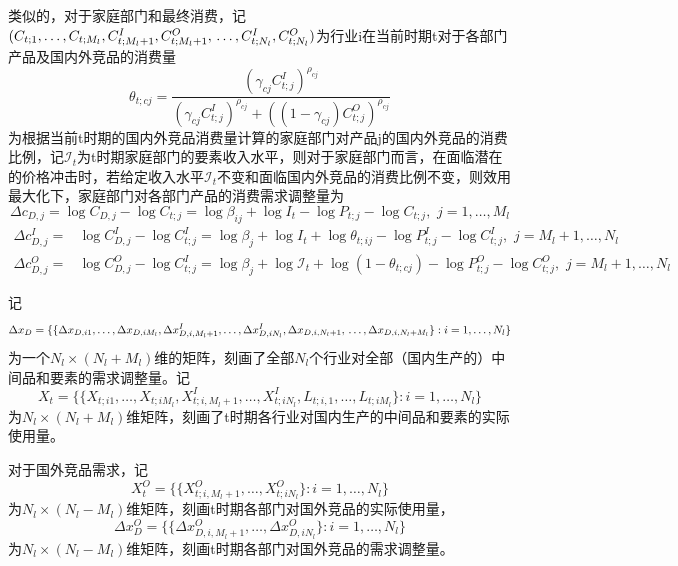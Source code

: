 \documentclass{article}
\begin{document}
类似的，对于家庭部门和最终消费，记
$(C_{t;1},\dots,C_{t;M_l},C_{t;M_l+1}^I,C_{t;M_l+1}^O,\\\dots,C_{t;N_l}^I,C_{t;N_l}^O)$为行业i在当前时期t对于各部门产品及国内外竞品的消费量
\begin{equation}
\theta_{t;cj}=\frac{\left(\gamma_{cj}C_{t;j}^I\right)^{\rho_{cj}}}{\left(\gamma_{cj}C_{t;j}^I\right)^{\rho_{cj}}+\left((1-\gamma_{cj})C_{t;j}^O\right)^{\rho_{cj}}}
\end{equation} 为根据当前t时期的国内外竞品消费量计算的家庭部门对产品j的国内外竞品的消费比例，记$\mathcal{I}_{t}$为t时期家庭部门的要素收入水平，则对于家庭部门而言，在面临潜在的价格冲击时，若给定收入水平$\mathcal{I}_t$不变和面临国内外竞品的消费比例不变，则效用最大化下，家庭部门对各部门产品的消费需求调整量为
\begin{equation}\label{Adj1}
    \Delta c_{D,j}=\log C_{D,j}-\log C_{t;j}=\log \beta_{ij}+\log I_{t} -\log P_{t;j} -\log C_{t;j},\,\,j=1,\dots,M_l
\end{equation}
\begin{equation}\label{Adj2}
\begin{aligned}
     \Delta c^I_{D,j}=&\log C^I_{D,j}-\log C^I_{t;j}=\log \beta_{j}+\log I_{t} +\log\theta_{t;ij}-\log P^I_{t;j}  -\log C^I_{t;j},\,\,j=M_l+1,\dots,N_l
\end{aligned}
\end{equation}
\begin{equation}\label{Adj3}
\begin{aligned}
      \Delta c^O_{D,j}=&\log C^O_{D,j}-\log C^I_{t;j}=\log \beta_{j}+\log \mathcal{I}_{t} +\log(1-\theta_{t;cj})-\log P^O_{t;j}  -\log C^O_{t;j},\,\,j=M_l+1,\dots,N_l
\end{aligned}
\end{equation} 




记$$\Delta x_D=\{\{\Delta x_{D,i1},\dots,\Delta x_{D,iM_l},\Delta x^I_{D,i,M_l+1},\dots,\Delta x^I_{D,iN_l},\Delta x_{D,i,N_l+1},\\\dots,\Delta x_{D,i,N_l+M_l} \}:i=1,\dots,N_l\}$$为一个$N_l\times (N_l+M_l)$维的矩阵，刻画了全部$N_l$个行业对全部（国内生产的）中间品和要素的需求调整量。记$$X_t=\{\{X_{t;i1},\dots,X_{t;iM_l},X^I_{t;i,M_l+1},\dots,X^I_{t;iN_l},L_{t;i,1},\dots,L_{t;iM_l} \}:i=1,\dots,N_l\}$$为$N_l\times (N_l+M_l)$维矩阵，刻画了t时期各行业对国内生产的中间品和要素的实际使用量。

对于国外竞品需求，记$$X_t^O=\{\{X_{t;i,M_l+1}^O,\dots,X_{t;iN_l}^O\}:i=1,\dots,N_l\}$$为$N_l\times(N_l-M_l)$维矩阵，刻画t时期各部门对国外竞品的实际使用量，$$\Delta x^O_D=\{\{\Delta x_{D,i,M_l+1}^O,\dots,\Delta x_{D,iN_l}^O\}:i=1,\dots,N_l\}$$为$N_l\times(N_l-M_l)$维矩阵，刻画t时期各部门对国外竞品的需求调整量。
\end{document}
